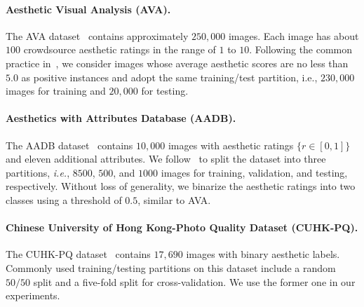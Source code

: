 \documentclass[letterpaper]{article}
\begin{document}
\paragraph{Aesthetic Visual Analysis (AVA).}
The AVA dataset~\cite{murray2012ava} contains approximately $250,000$ images. %
Each image has about $100$ crowdsource aesthetic ratings in the range of $1$ to $10$.
Following the common practice in~\cite{ma2017lamp,hosu2019effective}, we consider images whose average aesthetic scores are no less than $5.0$ as positive instances and adopt the same training/test partition, i.e., $230,000$ images for training and $20,000$ for testing.

\paragraph{Aesthetics with Attributes Database (AADB).}
The AADB dataset~\cite{kong2016photo} contains $10,000$ images with aesthetic ratings $\{ r \in [0, 1] \}$ and eleven additional attributes.%
We follow~\cite{kong2016photo} to split the dataset into three partitions, \emph{i.e.}, $8500$, $500$, and $1000$ images for training, validation, and testing, respectively.
Without loss of generality, we binarize the aesthetic ratings into two classes using a threshold of $0.5$, similar to AVA.

\paragraph{Chinese University of Hong Kong-Photo Quality Dataset (CUHK-PQ).}
The CUHK-PQ dataset~\cite{luo2011content} contains $17,690$ images with binary aesthetic labels.
Commonly used training/testing partitions on this dataset include a random $50/50$ split and a five-fold split for cross-validation.
We use the former one in our experiments.
\end{document}
